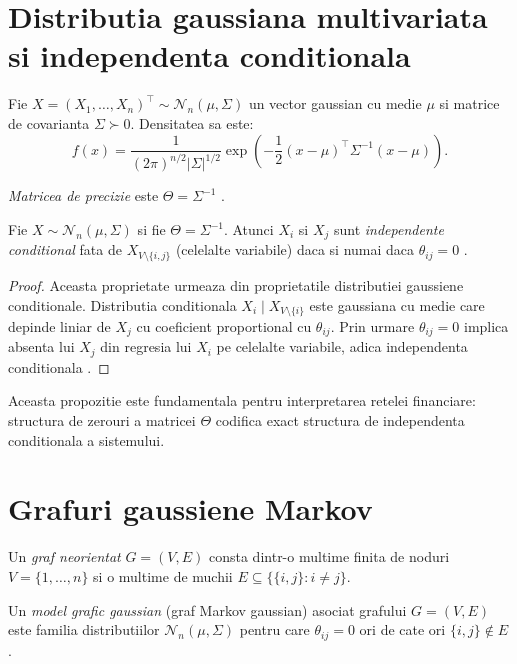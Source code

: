 \section{Distributia gaussiana multivariata si independenta conditionala}

Fie $X = (X_1, \ldots, X_n)^\top \sim \mathcal{N}_n(\mu, \Sigma)$ un vector
gaussian cu medie $\mu$ si matrice de covarianta $\Sigma \succ 0$. Densitatea
sa este:
\[
    f(x) = \frac{1}{(2\pi)^{n/2} |\Sigma|^{1/2}}
    \exp\!\left(-\frac{1}{2}(x-\mu)^\top \Sigma^{-1}(x-\mu)\right).
\]

\begin{definition}
\textit{Matricea de precizie} este $\Theta = \Sigma^{-1}$ \citep{lauritzen1996}.
\end{definition}

\begin{proposition}
Fie $X \sim \mathcal{N}_n(\mu, \Sigma)$ si fie $\Theta = \Sigma^{-1}$.
Atunci $X_i$ si $X_j$ sunt \textit{independente conditional} fata de
$X_{V \setminus \{i,j\}}$ (celelalte variabile) daca si numai daca
$\theta_{ij} = 0$ \citep{lauritzen1996}.
\end{proposition}

\begin{proof}
Aceasta proprietate urmeaza din proprietatile distributiei gaussiene conditionale.
Distributia conditionala $X_i \mid X_{V \setminus \{i\}}$ este gaussiana cu
medie care depinde liniar de $X_j$ cu coeficient proportional cu $\theta_{ij}$.
Prin urmare $\theta_{ij} = 0$ implica absenta lui $X_j$ din regresia lui $X_i$
pe celelalte variabile, adica independenta conditionala \citep{lauritzen1996}.
\end{proof}

Aceasta propozitie este fundamentala pentru interpretarea retelei financiare:
structura de zerouri a matricei $\Theta$ codifica exact structura de independenta
conditionala a sistemului.

\section{Grafuri gaussiene Markov}

\begin{definition}
Un \textit{graf neorientat} $G = (V, E)$ consta dintr-o multime finita de noduri
$V = \{1, \ldots, n\}$ si o multime de muchii $E \subseteq \{\{i,j\} : i \neq j\}$.
\end{definition}

\begin{definition}
Un \textit{model grafic gaussian} (graf Markov gaussian) asociat grafului
$G = (V, E)$ este familia distributiilor $\mathcal{N}_n(\mu, \Sigma)$ pentru
care $\theta_{ij} = 0$ ori de cate ori $\{i,j\} \notin E$ \citep{lauritzen1996}.
\end{definition}

